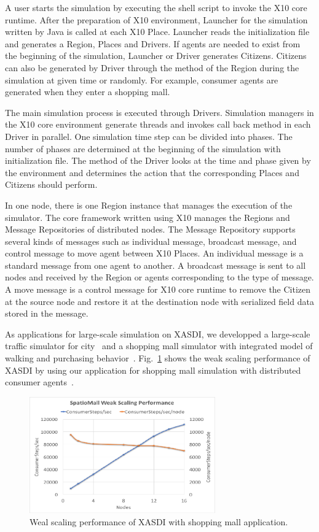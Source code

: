A user starts the simulation by executing the shell script to invoke the X10 core runtime.
After the preparation of X10 environment, Launcher for the simulation written by Java is called at each X10 Place.
Launcher reads the initialization file and generates a Region, Places and Drivers.
If agents are needed to exist from the beginning of the simulation, Launcher or Driver generates Citizens.
Citizens can also be generated by Driver through the method of the Region during the simulation at given time or randomly. For example, consumer agents are generated when they enter a shopping mall.

The main simulation process is executed through Drivers.
Simulation managers in the X10 core environment generate threads and invokes call back method in each Driver in parallel.
One simulation time step can be divided into phases. The number of phases are determined at the beginning of the simulation with initialization file.
The method of the Driver looks at the time and phase given by the environment and determines the action that the corresponding Places and Citizens should perform.


In one node, there is one Region instance that manages the execution of the simulator.
The core framework written using X10 manages the Regions and Message Repositories of distributed nodes.
The Message Repository supports several kinds of messages such as individual message, broadcast message, and control message to move agent between X10 Places.
An individual message is a standard message from one agent to another.
A broadcast message is sent to all nodes and received by the Region or agents corresponding to the type of message.
A move message is a control message for X10 core runtime to remove the Citizen at the source node and restore it at the destination node with serialized field data stored in the message.


As applications for large-scale simulation on XASDI, we developped a large-scale traffic simulator for city~\cite{osogami2013toward} and a shopping mall simulator with integrated model of walking and purchasing behavior~\cite{mizuta2017wsc}.
Fig.~\ref{fig:Figs.mizuta/xasdiscaling} shows the weak scaling performance of XASDI by using our application for shopping mall simulation with distributed consumer agents~\cite{ppl2018takeuchi}.
\begin{figure}[h]
  \centering
  \includegraphics[width=8cm]{Figs.mizuta/xasdiscaling.pdf}
  \caption{Weal scaling performance of XASDI with shopping mall application.}
  \label{fig:Figs.mizuta/xasdiscaling}
\end{figure}
